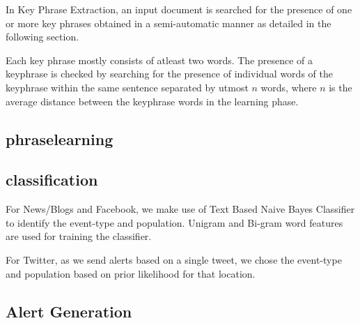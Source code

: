 In Key Phrase Extraction, an input document is searched for the presence of one or more key phrases obtained in a semi-automatic manner as detailed in the following section. 

Each key phrase mostly consists of atleast two words.
The presence of a keyphrase is checked by searching for the presence of individual words of the keyphrase within the same sentence separated by utmost $n$ words, where $n$ is the average distance between the keyphrase words in the learning phase.



\subsection{phraselearning}
\label{sec:phraselearning}



\subsection{classification}
For News/Blogs and Facebook, we make use of Text Based Naive Bayes Classifier to identify the event-type and population. Unigram and Bi-gram word features are used for training the classifier.

For Twitter, as we send alerts based on a single tweet, we chose the event-type and population based on prior likelihood for that location.

\subsection{Alert Generation}


